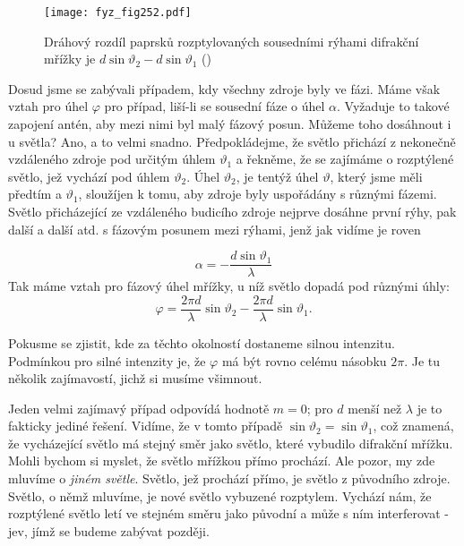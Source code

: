     \begin{figure}[ht!] %
      \centering
      \texttt{[image: fyz\_fig252.pdf]}
      \caption{Dráhový rozdíl paprsků rozptylovaných sousedními rýhami difrakční mřížky je 
               \(d\sin\vartheta_2 - d\sin\vartheta_1\)
               (\cite[s.~396]{Feynman01})}
      \label{fyz:fig252}
    \end{figure}
    
    Dosud jsme se zabývali případem, kdy všechny zdroje byly ve fázi. Máme však vztah pro úhel 
    \(\varphi\) pro případ, liší-li se sousední fáze o úhel \(\alpha\). Vyžaduje to takové zapojení 
    antén, aby mezi nimi byl malý fázový posun. Můžeme toho dosáhnout i u světla? Ano, a to velmi 
    snadno. Předpokládejme, že světlo přichází z nekonečně vzdáleného zdroje pod určitým úhlem 
    \(\vartheta_1\) a řekněme, že se zajímáme o rozptýlené světlo, jež vychází pod úhlem 
    \(\vartheta_2\). Úhel \(\vartheta_2\), je tentýž úhel \(\vartheta\), který jsme měli předtím 
    a \(\vartheta_1\), sloužíjen k tomu, aby zdroje byly uspořádány s různými fázemi. Světlo 
    přicházející ze vzdáleného budicího zdroje nejprve dosáhne první rýhy, pak další a další atd. s 
    fázovým posunem mezi rýhami, jenž jak vidíme je roven
    
    \begin{equation*}
      \alpha = - \frac{d\sin\vartheta_1}{\lambda}
    \end{equation*}
    Tak máme vztah pro fázový úhel mřížky, u níž světlo dopadá pod různými úhly:
    \begin{equation}\label{fyz:eq324}
      \varphi = \frac{2\pi d}{\lambda}\sin\vartheta_2 - 
                \frac{2\pi d}{\lambda}\sin\vartheta_1.               
    \end{equation}
    
    Pokusme se zjistit, kde za těchto okolností dostaneme silnou intenzitu. Podmínkou pro silné 
    intenzity je, že \(\varphi\) má být rovno celému násobku \(2\pi\). Je tu několik zajímavostí, 
    jichž si musíme všimnout.
    
    Jeden velmi zajímavý případ odpovídá hodnotě \(m = 0\); pro \(d\) menší než \(\lambda\) je to 
    fakticky jediné řešení. Vidíme, že v tomto případě \(\sin\vartheta_2 = \sin\vartheta_1\), což 
    znamená, že vycházející světlo má stejný směr jako světlo, které vybudilo difrakční mřížku. 
    Mohli bychom si myslet, že světlo mřížkou přímo prochází. Ale pozor, my zde mluvíme o 
    \emph{jiném světle}. Světlo, jež prochází přímo, je světlo z původního zdroje. Světlo, o němž 
    mluvíme, je nové světlo vybuzené rozptylem. Vychází nám, že rozptýlené světlo letí ve stejném 
    směru jako původní a může s ním interferovat - jev, jímž se budeme zabývat později.
    

